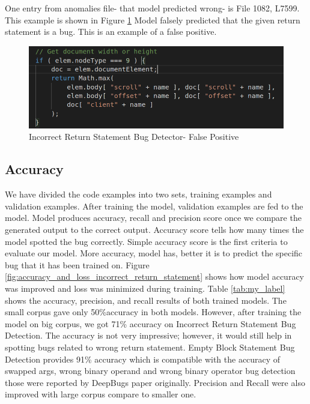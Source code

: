 \documentclass[sigconf]{acmart}
\begin{document}
One entry from anomalies file- that model predicted wrong- is File 1082, L7599. This example is shown in Figure \ref{false positive} Model falsely predicted that the given return statement is a bug. This is an example of a false positive. 



\begin{figure}[!ht]
  \includegraphics[width= \linewidth]{return_statment Predicted Wrong.png}
  \caption{\small Incorrect Return Statement Bug Detector- False Positive}\label{false positive}
\end{figure}


 
\subsection{Accuracy}
We have divided the code examples into two sets, training examples and validation examples. After training the model, validation examples are fed to the model. Model produces accuracy, recall and precision score once we compare the generated output to the correct output. Accuracy score tells how many times the model spotted the bug correctly. Simple accuracy score is the first criteria to evaluate our model. More accuracy, model has, better it is to predict the specific bug that it has been trained on. Figure \ref{fig:accuracy_and_loss_incorrect_return_statement} shows how model accuracy was improved and loss was minimized during training. Table \ref{tab:my_label} shows the accuracy, precision, and recall results of both trained models. The small corpus gave only 50\%accuracy in both models. However, after training the model on big corpus, we got 71\% accuracy on Incorrect Return Statement Bug Detection. The accuracy is not very impressive; however, it would still help in spotting bugs related to wrong return statement. Empty Block Statement Bug Detection provides 91\% accuracy which is compatible with the accuracy of swapped args, wrong binary operand and wrong binary operator bug detection those were reported by DeepBugs paper originally. Precision and Recall were also improved with large corpus compare to smaller one. 
\end{document}
